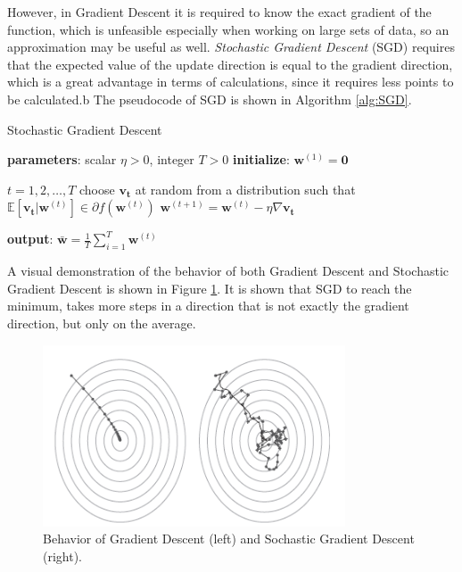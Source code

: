 However, in Gradient Descent it is required to know the exact gradient of the function, which is unfeasible especially when working on large sets of data, so an approximation may be useful as well. \textit{Stochastic Gradient Descent} (SGD) requires that the expected value of the update direction is equal to the gradient direction, which is a great advantage in terms of calculations, since it requires less points to be calculated.b The pseudocode of SGD is shown in Algorithm \ref{alg:SGD}.

\begin{algorithm}
	\caption{Stochastic Gradient Descent}\label{alg:SGD}
	\begin{algorithmic}[1]
		\State \textbf{parameters}: scalar $\eta > 0$, integer $T>0$
		\State \textbf{initialize}: $\mathbf{w}^{(1)} = \mathbf{0}$
		
		\For $t = 1, 2, \dots , T$
		\State choose $\mathbf{v_t}$ at random from a distribution such that $\mathbb{E}[\mathbf{v_t} | \mathbf{w}^{(t)}] \in \partial f(\mathbf{w}^{(t)})$
		\State $\mathbf{w}^{(t+1)} = \mathbf{w}^{(t)} - \eta \nabla \mathbf{v_t}$
		\EndFor
		
		\State \textbf{output}: $\mathbf{\bar{w}} = \frac{1}{T} \sum_{i=1}^{T} \mathbf{w}^{(t)}$
	\end{algorithmic}
\end{algorithm}

A visual demonstration of the behavior of both Gradient Descent and Stochastic Gradient Descent is shown in Figure \ref{fig:gd-sgd}. It is shown that SGD to reach the minimum, takes more steps in a direction that is not exactly the gradient direction, but only on the average.


\begin{figure}[ht]
	\centering
	\includegraphics[width=0.8\textwidth]{figures/gd-sgd.png}
	\caption{Behavior of Gradient Descent (left) and Sochastic Gradient Descent (right).}
	\label{fig:gd-sgd}
\end{figure}


